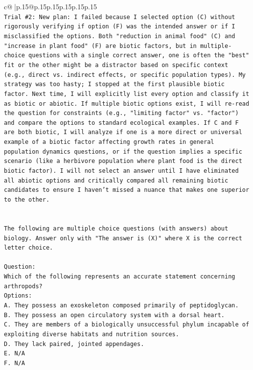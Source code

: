 \documentclass{article}
\begin{document}
{\begin{supertabular}{c@{$\;$}|p{.15\linewidth}@{}p{.15\linewidth}p{.15\linewidth}p{.15\linewidth}p{.15\linewidth}p{.15\linewidth}}
{{{\\ 
\texttt{Trial \#2: New plan: I failed because I selected option (C) without rigorously verifying if option (F) was the intended answer or if I misclassified the options. Both "reduction in animal food" (C) and "increase in plant food" (F) are biotic factors, but in multiple{-}choice questions with a single correct answer, one is often the "best" fit or the other might be a distractor based on specific context (e.g., direct vs. indirect effects, or specific population types). My strategy was too hasty; I stopped at the first plausible biotic factor. Next time, I will explicitly list every option and classify it as biotic or abiotic. If multiple biotic options exist, I will re{-}read the question for constraints (e.g., "limiting factor" vs. "factor") and compare the options to standard ecological examples. If C and F are both biotic, I will analyze if one is a more direct or universal example of a biotic factor affecting growth rates in general population dynamics questions, or if the question implies a specific scenario (like a herbivore population where plant food is the direct biotic factor). I will not select an answer until I have eliminated all abiotic options and critically compared all remaining biotic candidates to ensure I haven't missed a nuance that makes one superior to the other.} \\
\\ 
\\ 
\texttt{The following are multiple choice questions (with answers) about biology. Answer only with "The answer is (X)" where X is the correct letter choice.} \\
\\ 
\texttt{Question:} \\
\texttt{Which of the following represents an accurate statement concerning arthropods?} \\
\texttt{Options:} \\
\texttt{A. They possess an exoskeleton composed primarily of peptidoglycan.} \\
\texttt{B. They possess an open circulatory system with a dorsal heart.} \\
\texttt{C. They are members of a biologically unsuccessful phylum incapable of exploiting diverse habitats and nutrition sources.} \\
\texttt{D. They lack paired, jointed appendages.} \\
\texttt{E. N/A} \\
\texttt{F. N/A} \\
}}}
\end{supertabular}}
\end{document}
